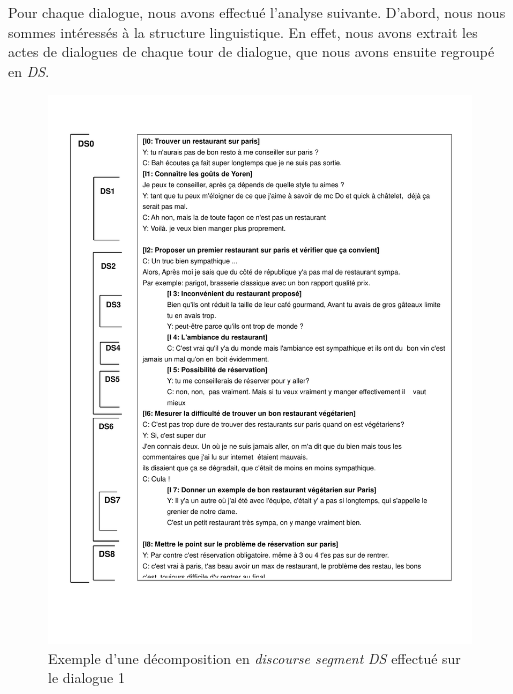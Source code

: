 Pour chaque dialogue, nous avons effectué l'analyse suivante. 
D'abord, nous nous sommes intéressés à la structure linguistique. En effet, nous avons extrait les actes de dialogues de chaque tour de dialogue, que nous avons ensuite regroupé en \emph{DS}. 
\begin{figure}[!h]
	\includegraphics[width=5in]{Figures/YC_DSP.pdf}
	\caption{\label{fig:DSP2} Exemple d'une décomposition en \emph{discourse segment} \emph{DS} effectué sur le dialogue 1}
\end{figure} 

